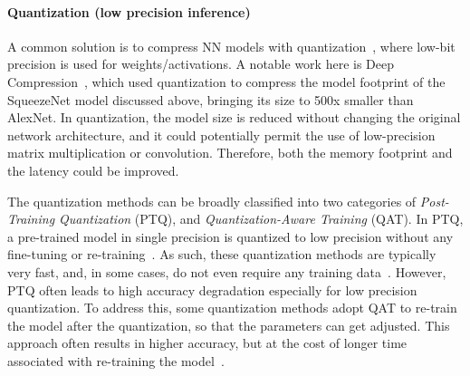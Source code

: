 
\paragraph{Quantization (low precision inference)}
A common solution is to compress NN models with quantization~\cite{asanovic1991experimental, hubara2016binarized, rastegari2016xnor, zhou2017incremental, zhou2016dorefa, cai2017deep, jacob2018quantization, zhang2018lq, choi2018pact, wang2019haq, dong2019hawq, chin2020one, cai2020zeroq},
where low-bit precision is used for weights/activations.
A notable work here is Deep Compression~\cite{han2015deep}, which used
quantization to compress the model footprint of the
SqueezeNet model discussed above, bringing its size to 500x smaller than AlexNet. 
In quantization, the model size is reduced without changing the original network architecture,
and it could potentially permit the use of low-precision matrix multiplication or convolution. Therefore, both the memory footprint
and the latency could be improved.

The quantization methods can be broadly classified into two categories of \emph{Post-Training Quantization} (PTQ),
and \emph{Quantization-Aware Training} (QAT). In PTQ, a pre-trained model in single precision is quantized to low precision
without any fine-tuning or re-training~\cite{banner2018post,meller2019same,choukroun2019low,zhao2019improving,fang2020post,fang2020near,lee2018quantization,nagel2019data,cai2020zeroq,hawks2021ps}. As such, these quantization methods are typically very fast, and, in some cases, do not even require any training data~\cite{cai2020zeroq, haroush2020knowledge,nagel2019data}.
However, PTQ often leads to high accuracy degradation especially for low precision quantization.
To address this, some quantization methods adopt QAT to re-train the model after the quantization, so that the parameters can
get adjusted. This approach often results in higher accuracy, but at the cost of longer
time associated with re-training the model~\cite{courbariaux2015binaryconnect,lin2015neural,hubara2016binarized,rastegari2016xnor,zhou2016dorefa,zhu2016trained,cai2017deep,hou2016loss,gysel2018ristretto,zhou2018explicit}.

